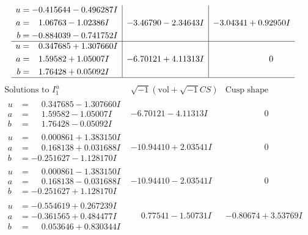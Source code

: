 \documentclass[1p]{elsarticle_modified}
\theoremstyle{definition}
\newcommand{\I}{\sqrt{-1}}
\begin{document}
$$\begin{array}{c|c|c}
\begin{aligned}
u &= -0.415644 - 0.496287 I \\
a &= \phantom{-}1.06763 - 1.02386 I \\
b &= -0.884039 - 0.741752 I\end{aligned}
 & -3.46790 - 2.34643 I & -3.04341 + 0.92950 I \\ \hline\begin{aligned}
u &= \phantom{-}0.347685 + 1.307660 I \\
a &= \phantom{-}1.59582 + 1.05007 I \\
b &= \phantom{-}1.76428 + 0.05092 I\end{aligned}
 & -6.70121 + 4.11313 I & \phantom{-0.000000 } 0\\
 \hline 
 \end{array}$$\newpage$$\begin{array}{c|c|c}  
\text{Solutions to }I^u_{1}& \I (\text{vol} + \sqrt{-1}CS) & \text{Cusp shape}\\
 \hline 
\begin{aligned}
u &= \phantom{-}0.347685 - 1.307660 I \\
a &= \phantom{-}1.59582 - 1.05007 I \\
b &= \phantom{-}1.76428 - 0.05092 I\end{aligned}
 & -6.70121 - 4.11313 I & \phantom{-0.000000 } 0 \\ \hline\begin{aligned}
u &= \phantom{-}0.000861 + 1.383150 I \\
a &= \phantom{-}0.168138 + 0.031688 I \\
b &= -0.251627 - 1.128170 I\end{aligned}
 & -10.94410 + 2.03541 I & \phantom{-0.000000 } 0 \\ \hline\begin{aligned}
u &= \phantom{-}0.000861 - 1.383150 I \\
a &= \phantom{-}0.168138 - 0.031688 I \\
b &= -0.251627 + 1.128170 I\end{aligned}
 & -10.94410 - 2.03541 I & \phantom{-0.000000 } 0 \\ \hline\begin{aligned}
u &= -0.554619 + 0.267239 I \\
a &= -0.361565 + 0.484477 I \\
b &= \phantom{-}0.053646 + 0.830344 I\end{aligned}
 & \phantom{-}0.77541 - 1.50731 I & -0.80674 + 3.53769 I \\ \hline\begin{aligned}

\end{aligned}
\end{array}$$
\end{document}
